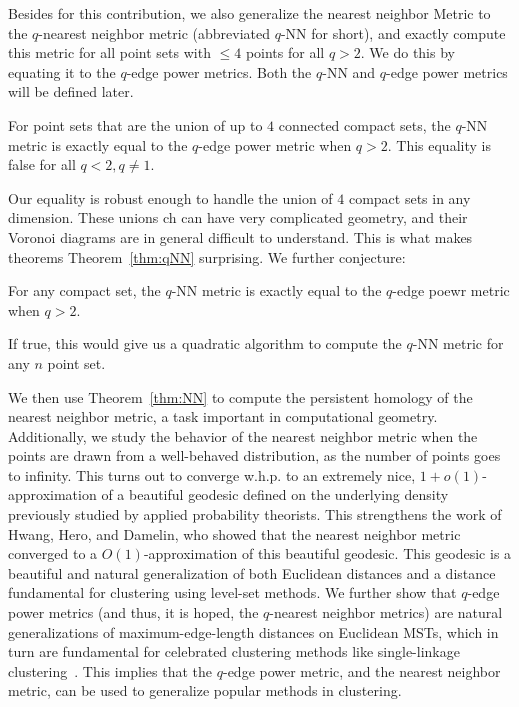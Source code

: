 Besides for this contribution, we also generalize the nearest neighbor
Metric to the $q$-nearest neighbor metric (abbreviated $q$-NN for short),
and exactly compute this metric for all point sets with $\leq 4$ points for all $q>2$. We
do this by equating it to the $q$-edge power metrics. Both the $q$-NN and
$q$-edge power metrics will be defined later.
\begin{theorem} \label{thm:qNN}
For point sets that are the union of up to $4$ connected compact sets, the $q$-NN metric is exactly equal to
the $q$-edge power metric when $q>2$. This equality is false for all $q <
2, q\not=1$.
\end{theorem}
Our equality is robust enough to handle the union of $4$ compact sets in
any dimension. These unions
ch can have very complicated geometry, and their Voronoi diagrams are in
general difficult to understand. This is what makes theorems
Theorem~\ref{thm:qNN} surprising. We further conjecture:
\begin{conjecture}\label{conj:qNN}
For any compact set, the $q$-NN metric is exactly equal to the $q$-edge
poewr metric when $q>2$.
\end{conjecture}
If true, this would give us a quadratic algorithm to compute the $q$-NN
metric for any $n$ point set.

 We then use Theorem~\ref{thm:NN} to compute the persistent homology
of the nearest neighbor metric, a task important in computational geometry.
Additionally, we study the behavior of the nearest neighbor metric when the
points are drawn from a well-behaved distribution, as the number of points
goes to infinity. This turns out to converge w.h.p. to an extremely nice,
$1+o(1)$-approximation of a beautiful geodesic defined on the underlying
density previously studied by applied probability theorists. This
strengthens the work of Hwang, Hero, and Damelin, who showed that the
nearest neighbor metric converged to a $O(1)$-approximation of this
beautiful geodesic. This geodesic is a beautiful and natural generalization
of both Euclidean distances and a distance fundamental for clustering using
level-set methods. We further show that $q$-edge power metrics (and thus,
it is hoped, the $q$-nearest neighbor metrics) are natural generalizations
of maximum-edge-length distances on Euclidean MSTs, which in turn are
fundamental for celebrated clustering methods like single-linkage
clustering~\cite{}. This implies that the $q$-edge power metric, and the
nearest neighbor metric, can be used to generalize popular methods in
clustering.
